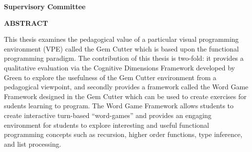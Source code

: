 \newpage
{}

\noindent \textbf{Supervisory Committee}
\tpbreak
\panel

\begin{center}
\textbf{ABSTRACT}
\end{center}

This thesis examines the pedagogical value of a particular visual programming environment (VPE) called the Gem Cutter which is based upon the functional programming paradigm.  The contribution of this thesis is two-fold: it provides a qualitative evaluation via the Cognitive Dimensions Framework developed by Green to explore the usefulness of the Gem Cutter environment from a pedagogical viewpoint, and secondly provides a framework called the Word Game Framework designed in the Gem Cutter which can be used to create exercises for sudents learning to program. The Word Game Framework allows students to create interactive turn-based ``word-games'' and provides an engaging environment for students to explore interesting and useful functional programming concepts such as recursion, higher order functions, type inference, and list processing.